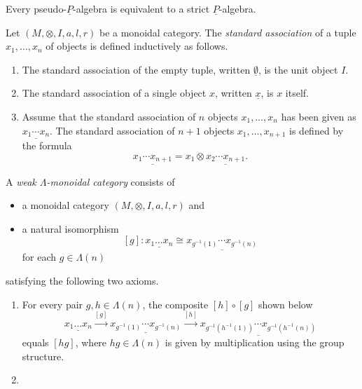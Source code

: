 \begin{cor}
Every pseudo-$\underline{P}$-algebra is equivalent to a strict $\underline{P}$-algebra.
\end{cor}

\begin{rem}\label{rem:ps-P-alg-unpack}
\end{rem}



\begin{nota}\label{nota:standard-assoc}
Let $(M, \otimes, I, a, l, r)$ be a monoidal category. The \emph{standard association} of a tuple $x_1, \ldots, x_n$ of objects is defined inductively as follows.
\begin{enumerate}
\item The standard association of the empty tuple, written $\underline{\emptyset}$, is the unit object $I$.
\item The standard association of a single object $x$, written $\underline{x}$, is $x$ itself.
\item Assume that the standard association of $n$ objects $x_1, \ldots, x_n$ has been given as $\underline{x_1 \cdots x_n}$. The standard association of $n+1$ objects $x_1, \ldots, x_{n+1}$ is defined by the formula
\[
\underline{x_1 \cdots x_{n+1}} = x_1 \otimes \underline{x_2 \cdots x_{n+1}}.
\]
\end{enumerate}
\end{nota}


\begin{Defi}\label{Defi:wk-lmc}
A \emph{weak $\Lambda$-monoidal category} consists of
\begin{itemize}
\item a monoidal category $(M, \otimes, I, a, l, r)$ and
\item a natural isomorphism
\[
[g] \colon \underline{x_1 \dots x_n} \cong \underline{x_{g^{-1}(1)} \cdots x_{g^{-1}(n)} }
\]
for each $g \in \Lambda(n)$
\end{itemize}
satisfying the following two axioms.
\begin{enumerate}
\item For every pair $g, h \in \Lambda(n)$, the composite $[h] \circ [g]$ shown below
\[
\underline{x_1 \dots x_n} \stackrel{[g]}{\to} \underline{x_{g^{-1}(1)} \cdots x_{g^{-1}(n)} } \stackrel{[h]}{\to} \underline{x_{g^{-1}(h^{-1}(1))} \cdots x_{g^{-1}(h^{-1}(n))} } 
\]
equals $[hg]$, where $hg \in \Lambda(n)$ is given by multiplication using the group structure.
\item {}
\end{enumerate}
\end{Defi}

